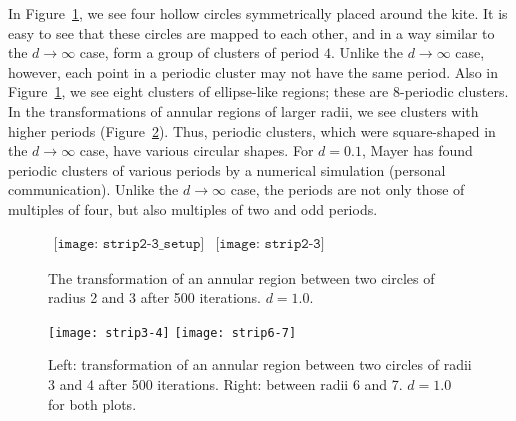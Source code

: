 \documentclass[10pt,twoside,draft]{book}
\begin{document}
In Figure~\ref{fig:strip2-3}, we see four hollow circles symmetrically placed around the kite.
It is easy to see that these circles are mapped to each other, and in a way similar to the $d \to \infty$ case, form a group of clusters of period $4$.
Unlike the $d \to \infty$ case, however, each point in a periodic cluster may not have the same period.
Also in Figure~\ref{fig:strip2-3}, we see eight clusters of ellipse-like regions; these are 8-periodic clusters.
In the transformations of annular regions of larger radii, we see clusters with higher periods (Figure~\ref{fig:strip3-4-6-7}).
Thus, periodic clusters, which were square-shaped in the $d \to \infty$ case, have various circular shapes.
For $d = 0.1$, Mayer has found periodic clusters of various periods by a numerical simulation (personal communication).
Unlike the $d \to \infty$ case, the periods are not only those of multiples of four, but also multiples of two and odd periods.

\begin{figure}[ht]
  \begin{center}
    $
    \begin{array}{l}
      \texttt{[image: strip2-3\_setup]}
    \end{array}
    $\scalebox{1.75}{$\Rar$}$
    \begin{array}{l}
      \texttt{[image: strip2-3]}
    \end{array}
    $
    \caption{
      The transformation of an annular region between two circles of radius 2 and 3 after 500 iterations.
      $d = 1.0$.
    }
    \label{fig:strip2-3}
  \end{center}
\end{figure}

\begin{figure}[ht]
  \begin{center}
    \texttt{[image: strip3-4]}
    \texttt{[image: strip6-7]}
    \caption{Left: transformation of an annular region between two circles of radii 3 and 4 after 500 iterations.
      Right: between radii 6 and 7.
      $d = 1.0$ for both plots.
    }
    \label{fig:strip3-4-6-7}
  \end{center}
\end{figure}
\end{document}
